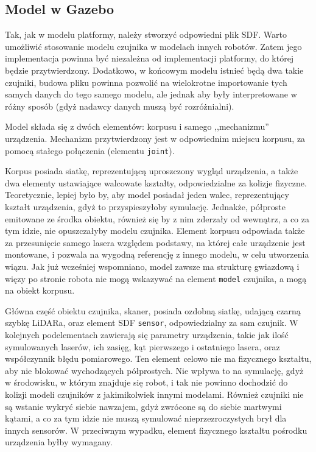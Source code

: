 		
		
		
	\subsection{Model w Gazebo}
		Tak, jak w modelu platformy, należy stworzyć odpowiedni plik SDF. 
		Warto umożliwić stosowanie modelu czujnika w modelach innych robotów. 
		Zatem jego implementacja powinna być niezależna od implementacji platformy, do której będzie przytwierdzony.
		Dodatkowo, w końcowym modelu istnieć będą dwa takie czujniki, budowa pliku powinna pozwolić na wielokrotne importowanie tych samych danych do tego samego modelu, 
		ale jednak aby były interpretowane w różny sposób (gdyż nadawcy danych muszą być rozróżnialni).

		Model składa się z dwóch elementów: korpusu i samego ,,mechanizmu'' urządzenia.
		Mechanizm przytwierdzony jest w odpowiednim miejscu korpusu, za pomocą stałego połączenia (elementu \texttt{joint}).

		Korpus posiada siatkę, reprezentującą uproszczony wygląd urządzenia, a także dwa elementy ustawiające walcowate kształty, odpowiedzialne za kolizje fizyczne.
		Teoretycznie, lepiej było by, aby model posiadał jeden walec, reprezentujący kształt urządzenia, gdyż to przyspieszyłoby symulację. 
		Jednakże, półproste emitowane ze środka obiektu, również się by z nim zderzały od wewnątrz, a co za tym idzie, nie opuszczałyby modelu czujnika.
		Element korpusu odpowiada także za przesunięcie samego lasera względem podstawy, na której całe urządzenie jest montowane, i 
		pozwala na wygodną referencję z innego modelu, w celu utworzenia wiązu.
		Jak już wcześniej wspomniano, model zawsze ma strukturę gwiazdową i więzy po stronie robota nie mogą wskazywać na element \texttt{model} czujnika, a mogą
		na obiekt korpusu.

		Główna część obiektu czujnika, skaner, posiada ozdobną siatkę, udającą czarną szybkę LiDARa, oraz element SDF \texttt{sensor}, odpowiedzialny za sam czujnik.
		W kolejnych podelementach zawierają się parametry urządzenia, takie jak ilość symulowanych laserów, ich zasięg, kąt pierwszego i ostatniego lasera, oraz współczynnik błędu pomiarowego. Ten element celowo nie ma fizycznego kształtu, aby nie blokować wychodzących półprostych. 
		Nie wpływa to na symulację, gdyż w środowisku, w którym znajduje się robot, i tak nie powinno dochodzić do kolizji modeli czujników z jakimikolwiek innymi modelami.
		Również czujniki nie są wstanie wykryć siebie nawzajem, gdyż zwrócone są do siebie martwymi kątami, a co za tym idzie nie muszą symulować nieprzezroczystych brył dla
		innych sensorów.
		W przeciwnym wypadku, element fizycznego kształtu pośrodku urządzenia byłby wymagany.

